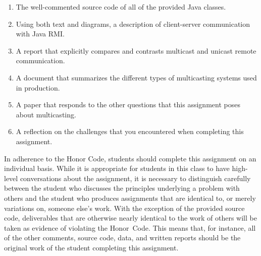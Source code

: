 \vspace*{-.1in}

\begin{enumerate}
  \itemsep 0em

  \item The well-commented source code of all of the provided Java classes.

  \item Using both text and diagrams, a description of client-server communication with Java RMI.

  \item A report that explicitly compares and contrasts multicast and unicast remote communication.

  \item A document that summarizes the different types of multicasting systems used in production.

  \item A paper that responds to the other questions that this assignment poses about multicasting.

  \item A reflection on the challenges that you encountered when completing this assignment.

\end{enumerate}

\vspace*{-.1in}


In adherence to the Honor Code, students should complete this assignment on an individual basis. While it is appropriate
for students in this class to have high-level conversations about the assignment, it is necessary to distinguish
carefully between the student who discusses the principles underlying a problem with others and the student who produces
assignments that are identical to, or merely variations on, someone else's work.  With the exception of the provided
source code, deliverables that are otherwise nearly identical to the work of others will be taken as evidence of
violating the \mbox{Honor Code}. This means that, for instance, all of the other comments, source code, data, and
written reports should be the original work of the student completing this assignment.



